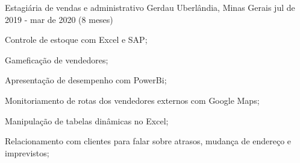 \cventry
    {Estagiária de vendas e administrativo}
    {Gerdau}
    {Uberlândia, Minas Gerais}
    {jul de 2019 - mar de 2020 (8 meses)}
    {
        \begin{cvitems}
            \item {
                Controle de estoque com Excel e SAP;
            }
            \item {
                Gameficação de vendedores;
            }
            \item {
                Apresentação de desempenho com PowerBi;
            }
            \item {
                Monitoriamento de rotas dos vendedores externos com Google Maps; 
            }
            \item {
                Manipulação de tabelas dinâmicas no Excel; 
            }
            \item {
                Relacionamento com clientes para falar sobre atrasos, mudança de endereço e imprevistos; 
            }
        \end{cvitems}
    }
    {}